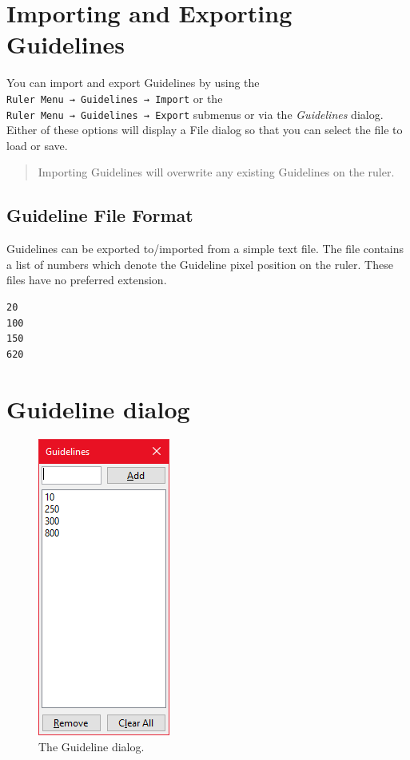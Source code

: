 \documentclass[
]{book}
\begin{document}
\hypertarget{importing-and-exporting-guidelines}{%
\section{Importing and Exporting Guidelines}\label{importing-and-exporting-guidelines}}

You can import and export Guidelines by using the \texttt{Ruler\ Menu\ →\ Guidelines\ →\ Import} or the \texttt{Ruler\ Menu\ →\ Guidelines\ →\ Export} submenus or via the \emph{Guidelines} dialog.
Either of these options will display a File dialog so that you can select the file to load or save.

\begin{quote}
Importing Guidelines will overwrite any existing Guidelines on the ruler.
\end{quote}

\hypertarget{guideline-file-format}{%
\subsection{Guideline File Format}\label{guideline-file-format}}

Guidelines can be exported to/imported from a simple text file.
The file contains a list of numbers which denote the Guideline pixel position on the ruler.
These files have no preferred extension.

\begin{verbatim}
20
100
150
620
\end{verbatim}

\hypertarget{guideline-dialog}{%
\section{Guideline dialog}\label{guideline-dialog}}

\begin{figure}
\centering
\includegraphics{images/guideline-dialog.png}
\caption{\label{fig:unnamed-chunk-3}The Guideline dialog.}
\end{figure}
\end{document}
